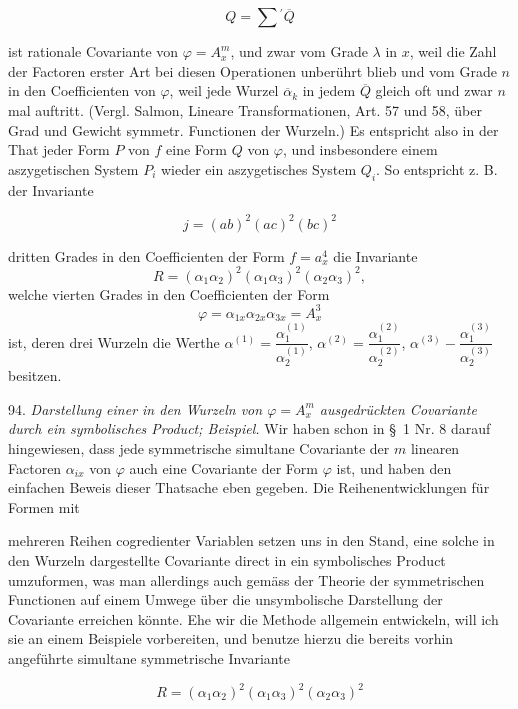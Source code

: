 \[
Q=\sum{}^{\prime}\overline{Q}
\]

ist rationale Covariante von $\varphi=A_x^m$, und zwar vom Grade $\lambda$ in $x$, weil die Zahl der Factoren erster Art bei diesen Operationen unberührt blieb und vom Grade $n$ in den Coefficienten von $\varphi$, weil jede Wurzel $\overline{\alpha}_k$ in jedem $\overline{Q}$ gleich oft und zwar $n$ mal auftritt. (Vergl. Salmon, Lineare Transformationen, Art. 57 und 58, über Grad und Gewicht symmetr. Functionen der Wurzeln.) Es entspricht also in der That jeder Form $P$ von $f$ eine Form $Q$ von $\varphi$, und insbesondere einem aszygetischen System $P_i$ wieder ein aszygetisches System $Q_i$. So entspricht z. B. der Invariante

\[
j=(ab)^2(ac)^2(bc)^2
\]

dritten Grades in den Coefficienten der Form $f=a_x^4$ die Invariante
\[
R=(\alpha_1\alpha_2)^2(\alpha_1\alpha_3)^2(\alpha_2\alpha_3)^2,
\]
welche vierten Grades in den Coefficienten der Form
\[
\varphi=\alpha_{1x}\alpha_{2x}\alpha_{3x}=A_x^3
\]
ist, deren drei Wurzeln die Werthe $\alpha^{(1)}=\dfrac{\alpha_1^{(1)}}{\alpha_2^{(1)}}$, $\alpha^{(2)}=\dfrac{\alpha_1^{(2)}}{\alpha_2^{(2)}}$, $\alpha^{(3)}-\dfrac{\alpha_1^{(3)}}{\alpha_2^{(3)}}$ %
besitzen.

94. \textit{Darstellung einer in den Wurzeln von $\varphi=A_x^m$ ausgedrückten Covariante durch ein symbolisches Product; Beispiel.} Wir haben schon in \S~1 Nr. 8 darauf hingewiesen, dass jede symmetrische simultane Covariante der $m$ linearen Factoren $\alpha_{ix}$ von $\varphi$ auch eine  Covariante der Form $\varphi$ ist, und haben den einfachen Beweis dieser Thatsache eben gegeben. Die Reihenentwicklungen für Formen mit


mehreren Reihen cogredienter Variablen setzen uns in den Stand, eine solche in den Wurzeln dargestellte Covariante direct in ein symbolisches Product umzuformen, was man allerdings auch gemäss der Theorie der symmetrischen Functionen auf einem Umwege über die unsymbolische Darstellung der Covariante erreichen könnte. Ehe wir die Methode allgemein entwickeln, will ich sie an einem Beispiele vorbereiten, und benutze hierzu die bereits vorhin angeführte simultane symmetrische Invariante

\[
R=(\alpha_1\alpha_2)^2(\alpha_1\alpha_3)^2(\alpha_2\alpha_3)^2
\]

